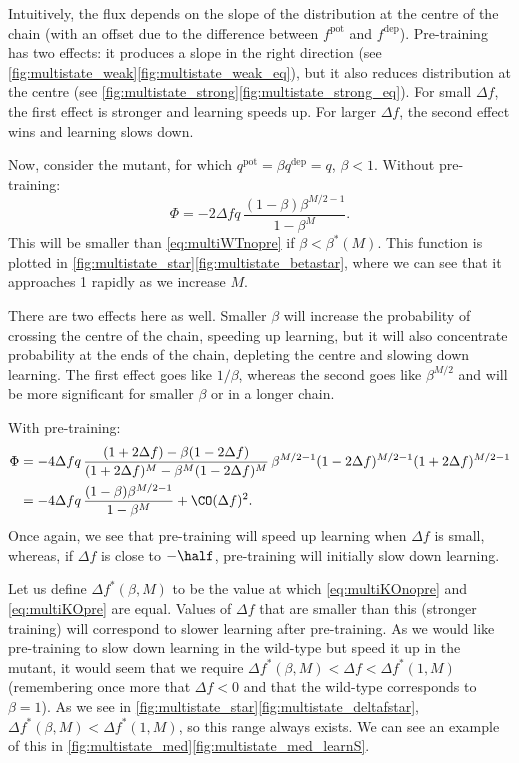 \documentclass[12pt]{article}
\newcommand{\pot}{^{\text{pot}}}
\newcommand{\dep}{^{\text{dep}}}
\begin{document}
Intuitively, the flux depends on the slope of the distribution at the centre of the chain (with an offset due to the difference between $f\pot$ and $f\dep$).
Pre-training has two effects: it produces a slope in the right direction (see \autoref{fig:multistate_weak}\ref{fig:multistate_weak_eq}), but it also reduces distribution at the centre (see \autoref{fig:multistate_strong}\ref{fig:multistate_strong_eq}).
For small $\Delta f$, the first effect is stronger and learning speeds up.
For larger $\Delta f$, the second effect wins and learning slows down.

Now, consider the mutant, for which $q\pot=\beta q\dep=q$, $\beta<1$.
Without pre-training:
%
\begin{equation}\label{eq:multiKOnopre}
  \Phi = -2\Delta f q\,\frac{(1-\beta)\beta^{M/2-1}}{1-\beta^M}.
\end{equation}
%
This will be smaller than \eqref{eq:multiWTnopre} if $\beta<\beta^*(M)$.
This function is plotted in \autoref{fig:multistate_star}\ref{fig:multistate_betastar}, where we can see that it approaches 1 rapidly as we increase $M$.

There are two effects here as well.
Smaller $\beta$ will increase the probability of crossing the centre of the chain, speeding up learning, but it will also concentrate probability at the ends of the chain, depleting the centre and slowing down learning.
The first effect goes like $1/\beta$, whereas the second goes like $\beta^{M/2}$ and will be more significant for smaller $\beta$ or in a longer chain.

With pre-training:
%
\begin{equation}\label{eq:multiKOpre}
\begin{aligned}
  \Phi &= -4\Delta f q \, \frac{(1+2\Delta f) - \beta(1-2\Delta f)}
          {(1+2\Delta f)^M - \beta^M(1-2\Delta f)^M}   \,
          \beta^{M/2-1}(1-2\Delta f)^{M/2-1} (1+2\Delta f)^{M/2-1} \\
       &= -4\Delta f q\,\frac{(1-\beta)\beta^{M/2-1}}{1-\beta^M} + \CO(\Delta f)^2.
\end{aligned}
\end{equation}
%
Once again, we see that pre-training will speed up learning when $\Delta f$ is small, whereas, if $\Delta f$ is close to $-\half$, pre-training will initially slow down learning.

Let us define $\Delta f^*(\beta,M)$ to be the value at which \eqref{eq:multiKOnopre} and \eqref{eq:multiKOpre} are equal.
Values of $\Delta f$ that are smaller than this (stronger training) will correspond to slower learning after pre-training.
As we would like pre-training to slow down learning in the wild-type but speed it up in the mutant, it would seem that we require $\Delta f^*(\beta,M) < \Delta f < \Delta f^*(1,M)$ (remembering once more that $\Delta f<0$ and that the wild-type corresponds to $\beta=1$).
As we see in \autoref{fig:multistate_star}\ref{fig:multistate_deltafstar}, $\Delta f^*(\beta,M) < \Delta f^*(1,M)$, so this range always exists.
We can see an example of this in \autoref{fig:multistate_med}\ref{fig:multistate_med_learnS}.
\end{document}
